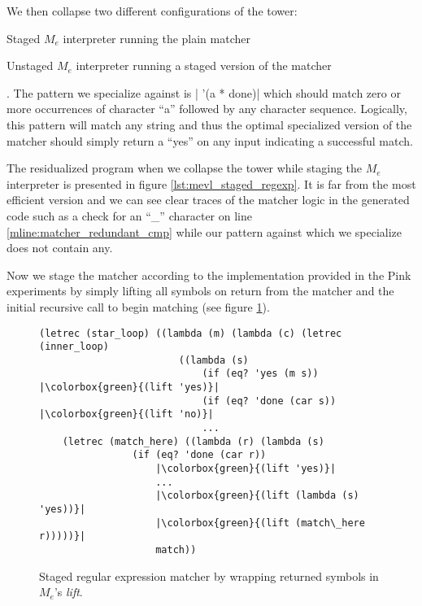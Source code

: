 \documentclass[a4paper,12pt,twoside,openright]{report}
\theoremstyle{definition}
\newcommand{\mevl}{$M_{e}$}
\begin{document}
We then collapse two different configurations of the tower:
\begin{enumerate*}[label=(\arabic*)]
    \item Staged \mevl{} interpreter running the plain matcher
    \item Unstaged \mevl{} interpreter running a staged version of the matcher
\end{enumerate*}. The pattern we specialize against is
|    '(a * done)|
which should match zero or more occurrences of character ``a'' followed by any character sequence. Logically, this pattern will match any string and thus the optimal specialized version of the matcher should simply return a ``yes'' on any input indicating a successful match.

The residualized program when we collapse the tower while staging the \mevl{} interpreter is presented in figure \ref{lst:mevl_staged_regexp}. It is far from the most efficient version and we can see clear traces of the matcher logic in the generated code such as a check for an ``\_'' character on line \ref{mline:matcher_redundant_cmp} while our pattern against which we specialize does not contain any.

Now we stage the matcher according to the implementation provided in the Pink experiments \cite{amin2017collapsing} by simply lifting all symbols on return from the matcher and the initial recursive call to begin matching (see figure \ref{lst:regexp_staged}).

\begin{figure}[htp!]
    \centering
    \begin{verbatim}
(letrec (star_loop) ((lambda (m) (lambda (c) (letrec (inner_loop)
                        ((lambda (s)
                            (if (eq? 'yes (m s)) |\colorbox{green}{(lift 'yes)}|
                            (if (eq? 'done (car s)) |\colorbox{green}{(lift 'no)}|
                            ...
    (letrec (match_here) ((lambda (r) (lambda (s)
                (if (eq? 'done (car r))
                    |\colorbox{green}{(lift 'yes)}|
                    ...
                    |\colorbox{green}{(lift (lambda (s) 'yes))}|
                    |\colorbox{green}{(lift (match\_here r)))))}|
                    match))
    \end{verbatim}
    \caption{Staged regular expression matcher by wrapping returned symbols in \mevl's \textit{lift}.}
    \label{lst:regexp_staged}
\end{figure}
\end{document}
